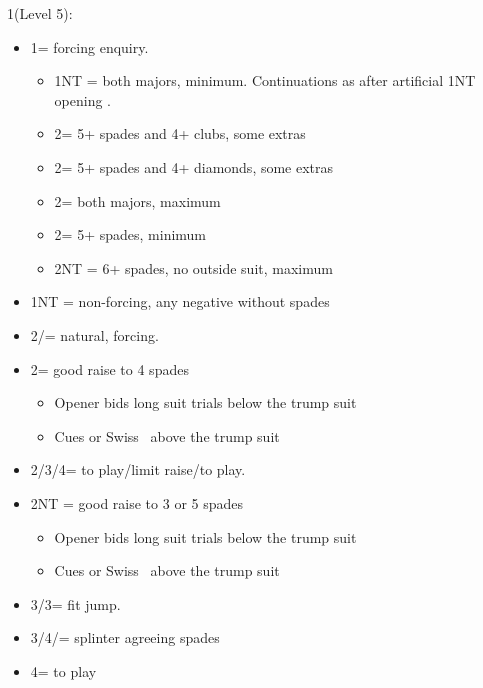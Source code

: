 \documentclass[a4paper,14pt]{extarticle}
\begin{document}
\begin{itemize}
{\it 
\item 1\hearts (Level 5):
	\begin{itemize}
\label{note:5}
   \item 1\spades = forcing enquiry.
		\begin{itemize}
      \item 1NT = both majors, minimum. Continuations as after artificial 1NT opening .
      \item 2\clubs = 5+ spades and 4+ clubs, some extras
      \item 2\diamonds = 5+ spades and 4+ diamonds, some extras
      \item 2\hearts = both majors, maximum
		\item 2\spades = 5+ spades, minimum
		\item 2NT = 6+ spades, no outside suit, maximum
		\end{itemize}
   \item 1NT = non-forcing, any negative without spades
\label{note:4}
   \item 2\clubs/\diamonds = natural, forcing.
   \item 2\hearts = good raise to 4 spades
		\begin{itemize}
		\item Opener bids long suit trials below the trump suit
		\item Cues or Swiss~ above the trump suit
		\end{itemize}
   \item 2\spades/3\spades/4\spades = to play/limit raise/to play.
\label{note:1}
   \item 2NT = good raise to 3 or 5 spades
		\begin{itemize}
		\item Opener bids long suit trials below the trump suit
		\item Cues or Swiss~ above the trump suit
		\end{itemize}
\label{note:2}
   \item 3\clubs/3\diamonds = fit jump.
\label{note:6}
   \item 3\hearts/4\clubs/\diamonds = splinter agreeing spades
	\item 4\hearts = to play
	\end{itemize}
}


\end{itemize}
\end{document}
